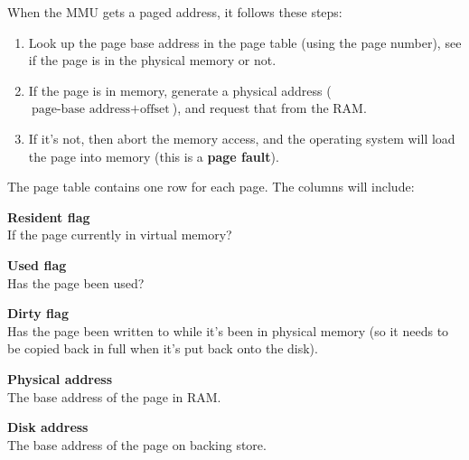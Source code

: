 When the MMU gets a paged address, it follows these steps:

\begin{enumerate}
	\item Look up the page base address in the page table (using the page number),
    see if the page is in the physical memory or not.
	\item If the page is in memory, generate a physical address (
		$\text{page-base address} + \text{offset}$), and request that from the
    RAM.
	\item If it's not, then abort the memory access, and the operating system
		will load the page into memory (this is a \textbf{page fault}).
\end{enumerate}


The page table contains one row for each page. The columns will include:

\begin{description}
	\item \textbf{Resident flag}\\
		If the page currently in virtual memory?
	\item \textbf{Used flag}\\
		Has the page been used?
	\item \textbf{Dirty flag}\\
		Has the page been written to while it's been in physical memory (so it
		needs to be copied back in full when it's put back onto the disk).
	\item \textbf{Physical address}\\
		The base address of the page in RAM.
	\item \textbf{Disk address}\\
		The base address of the page on backing store.
\end{description}

